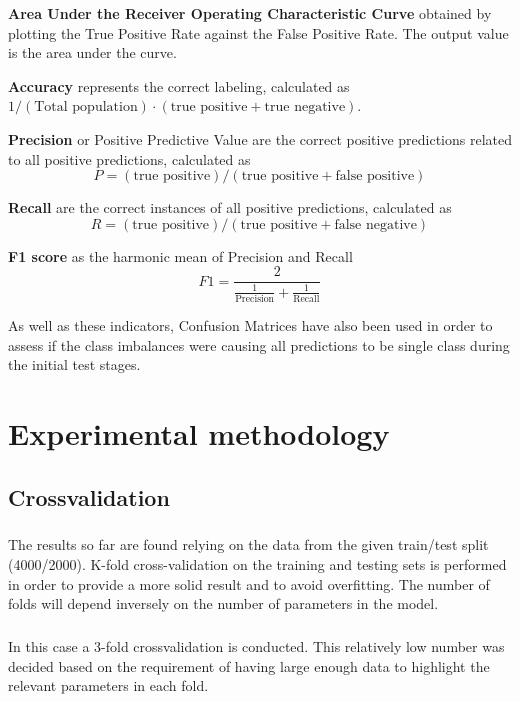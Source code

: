 \documentclass[12pt,a4paper]{report}
\begin{document}
\begin{list}{•}{}
\item \textbf{Area Under the Receiver Operating Characteristic Curve} obtained by plotting the True Positive Rate against the False Positive Rate. The output value is the area under the curve.
\item \textbf{Accuracy} represents the correct labeling, calculated as $1/(\text{Total population})\cdot (\text{true positive} + \text{true negative})$.
\item \textbf{Precision} or Positive Predictive Value are the correct positive predictions related to all positive predictions, calculated as $$P=(\text{true positive})/(\text{true positive}+\text{false positive})$$
\item \textbf{Recall} are the correct instances of all positive predictions, calculated as 
$$R=(\text{true positive})/(\text{true positive}+\text{false negative})$$
\item \textbf{F1 score} as the harmonic mean of Precision and Recall $$F1=\frac{2}{\frac{1}{\text{Precision}}+\frac{1}{\text{Recall}}}$$
\end{list}

As well as these indicators, Confusion Matrices have also been used in order to assess if the class imbalances were causing all predictions to be single class during the initial test stages.


\chapter{Experimental methodology}

\section{Crossvalidation}

\paragraph{} The results so far are found relying on the data from the given train/test split (4000/2000). K-fold cross-validation on the training and testing sets is performed in order to provide a more solid result and to avoid overfitting. The number of folds will depend inversely on the number of parameters in the model.

\paragraph{} In this case a 3-fold crossvalidation is conducted. This relatively low number was decided based on the requirement of having large enough data to highlight the relevant parameters in each fold.
\end{document}
